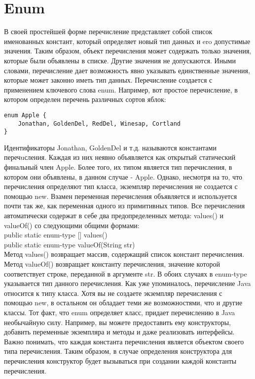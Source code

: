 \section{Enum}
В своей простейшей форме перечисление представляет собой список именованных констант, который определяет новый тип данных и ero допустимые значения. Таким образом, объект перечисления может содержать только значения, которые были объявлены в списке. Другие значения не допускаются. Иными словами, перечисление дает возможность явно указывать единственные значения, которые может законно иметь тип данных. Перечисление создается с применением ключевого слова enum. Например, вот простое перечисление, в котором определен перечень различных сортов
яблок: \\
\begin{lstlisting}
enum Apple { 
    Jonathan, GoldenDel, RedDel, Winesap, Cortland 
}
\end{lstlisting}
Идентификаторы Jonathan, GoldenDel и т.д. называются константами перечuсления. Каждая из них неявно объявляется как открытый статический финальный член Apple. Более того, их типом является тип перечисления, в котором они объявлены, в данном случае - Apple. Однако, несмотря на то, что перечисления определяют тип класса, экземпляр перечисления не создается с помощью new. Взамен переменная перечисления объявляется и используется почти так же, как переменная одного из примитивных типов. Все перечисления автоматически содержат в себе два предопределенных
метода: values() и valueOf() со следующими общими формами: \\
public static enum-type [] values() \\
public static enum-type valueOf(String str) \\
Метод values() возвращает массив, содержащий список констант перечисления. Метод valueOf() возвращает константу перечисления, значение которой соответствует строке, переданной в аргументе str. В обоих случаях в enum-type указывается тип данного перечисления. Как уже упоминалось, перечисление Java относится к типу класса. Хотя вы не создаете экземпляр перечисления с помощью new, в остальном он обладает теми же возможностями, что и другие классы. Тот факт, что enum определяет класс, придает перечислению в Java необычайную силу. Например, вы можете предоставить ему конструкторы, добавить переменные экземпляра и методы и даже реализовать интерфейсы. Важно понимать, что каждая константа перечисления является объектом своего типа перечисления. Таким образом, в случае определения конструктора для перечисления конструктор будет вызываться при создании каждой константы перечисления. \\
